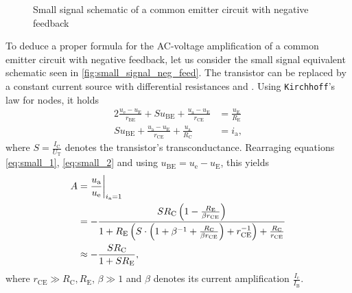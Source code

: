 \begin{figure}[tbp]
	\centering
	\caption{Small signal schematic of a common emitter circuit with negative feedback}
	\label{fig:small_signal_neg_feed}
\end{figure}

To deduce a proper formula for the AC-voltage amplification of a common emitter circuit with negative feedback, let us consider the small signal equivalent schematic seen in \autoref{fig:small_signal_neg_feed}.
The transistor can be replaced by a constant current source with differential resistances  and .
Using \texttt{Kirchhoff}'s law for nodes, it holds
\begin{alignat}{2}
	\frac{u_\text{e}-u_\text{E}}{r_\text{BE}}+Su_\text{BE}+\frac{u_\text{a}-u_\text{E}}{r_\text{CE}} &= \frac{u_\text{E}}{R_\text{E}} \label{eq:small_1}\\
	Su_\text{BE}+\frac{u_\text{a}-u_\text{E}}{r_\text{CE}} + \frac{u_\text{a}}{R_\text{C}}&= i_\text{a}, \label{eq:small_2}
\end{alignat}
where $S=\frac{I_\text{C}}{U_\text{T}}$ denotes the transistor's transconductance.
Rearraging equations \ref{eq:small_1}, \ref{eq:small_2} and using $u_\text{BE}=u_\text{e}-u_\text{E}$, this yields
\begin{align}
	A&=\frac{u_\text{a}}{u_\text{e}}\at[\bigg]{i_\text{a}=1} \nonumber \\
	&=-\frac{SR_\text{C}\left(1-\frac{R_\text{E}}{\beta r_\text{CE}}\right)}{1+R_\text{E}\left(S\cdot\left(1+\beta^{-1}+\frac{R_\text{C}}{\beta r_\text{CE}}\right)+r_\text{CE}^{-1}\right)+\frac{R_\text{C}}{r_\text{CE}}} \nonumber \\
	&\approx -\frac{SR_\text{C}}{1+SR_\text{E}}, \label{eq:amp_neg_fb}
\end{align}
where $r_\text{CE}\gg R_\text{C},R_\text{E}$, $\beta\gg 1$ and $\beta$ denotes its current amplification $\frac{I_\text{c}}{I_\text{B}}$.
